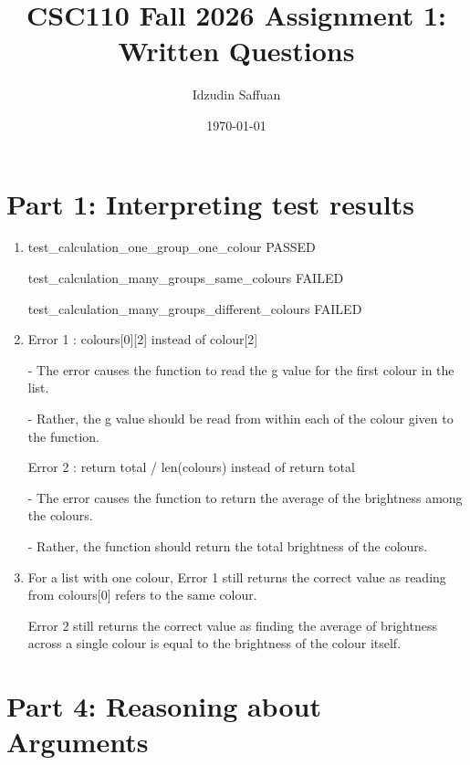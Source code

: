\documentclass[12pt]{article}
\title{CSC110 Fall 2026 Assignment 1: Written Questions}
\author{Idzudin Saffuan}
\date{\today}
\begin{document}
\maketitle

\section*{Part 1: Interpreting test results}


\begin{enumerate}
\item[1.]
test\_calculation\_one\_group\_one\_colour PASSED

test\_calculation\_many\_groups\_same\_colours FAILED

test\_calculation\_many\_groups\_different\_colours FAILED

\item[2.]
Error 1 : colours[0][2] instead of colour[2]

- The error causes the function to read the g value for the first colour in the list.

- Rather, the g value should be read from within each of the colour given to the function.

Error 2 : return total / len(colours) instead of return total

- The error causes the function to return the average of the brightness among the colours.

- Rather, the function should return the total brightness of the colours.

\item[3.]
For a list with one colour, Error 1 still returns the correct value as reading from colours[0] refers to the same colour.

Error 2 still returns the correct value as finding the average of brightness across a single colour is equal to the brightness of the colour itself.

\end{enumerate}

\section*{Part 4: Reasoning about Arguments}
\end{document}
